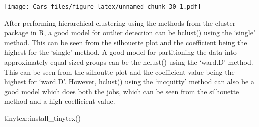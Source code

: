 \documentclass[
]{article}
\newenvironment{Shaded}{\begin{snugshade}}{\end{snugshade}}
\newcommand{\FunctionTok}[1]{\textcolor[rgb]{0.00,0.00,0.00}{#1}}
\newcommand{\NormalTok}[1]{#1}
\newcommand{\SpecialCharTok}[1]{\textcolor[rgb]{0.00,0.00,0.00}{#1}}
\begin{document}
\texttt{[image: Cars\_files/figure-latex/unnamed-chunk-30-1.pdf]}

After performing hierarchical clustering using the methods from the
cluster package in R, a good model for outlier detection can be hclust()
using the `single' method. This can be seen from the silhouette plot and
the coefficient being the highest for the `single' method. A good model
for partitioning the data into approximately equal sized groups can be
the hclust() using the `ward.D' method. This can be seen from the
silhoutte plot and the coefficient value being the highest for `ward.D'.
However, hclust() using the `mcquitty' method can also be a good model
which does both the jobs, which can be seen from the silhouette method
and a high coefficient value.

\begin{Shaded}
\begin{Highlighting}[]
\NormalTok{tinytex}\SpecialCharTok{::}\FunctionTok{install\_tinytex}\NormalTok{()}
\end{Highlighting}
\end{Shaded}
\end{document}
